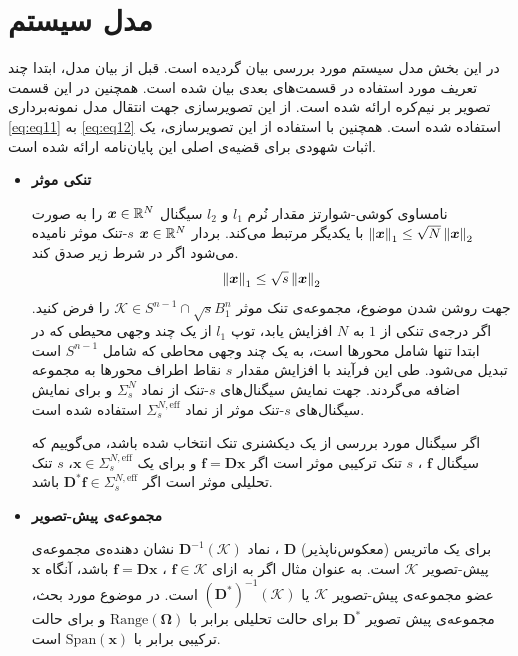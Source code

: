 \section{مدل سیستم}
در این بخش مدل سیستم مورد بررسی بیان گردیده است. قبل از بیان مدل، ابتدا چند تعریف مورد استفاده در قسمت‌های بعدی بیان شده است. همچنین در این قسمت تصویر بر نیم‌کره
ارائه شده است. از این تصویرسازی جهت انتقال مدل نمونه‌برداری 
\eqref{eq:eq11}
به 
\eqref{eq:eq12}
استفاده شده است. همچنین با استفاده از این تصویرسازی، یک اثبات شهودی برای قضیه‌ی اصلی این پایان‌نامه ارائه شده است.
\begin{itemize}
\item{
\textbf{تنکی موثر}


نامساوی کوشی-شوارتز مقدار نُرم
$ l_1 $
و 
$ l_2 $
سیگنال 
$ \bm{x}\in \mathbb{R}^{N} $
را به صورت 
$ \left\lVert\bm{x}\right\rVert_{1}\leq \sqrt{N}\left\lVert\bm{x}\right\rVert_{2} $
با یکدیگر مرتبط می‌کند.
بردار 
$ \bm{x}\in \mathbb{R}^{N} $
$s$-تنک موثر
نامیده می‌شود اگر در شرط زیر صدق کند.
\begin{align}
\label{eq:eq28}
\left\lVert\bm{x}\right\rVert_{1}\leq \sqrt{s}\left\lVert\bm{x}\right\rVert_{2}
\end{align}
جهت روشن شدن موضوع، مجموعه‌ی تنک موثر
$ \mathcal{K} \in S^{n-1}\cap \sqrt{s}B^{n}_{1} $
را فرض کنید. اگر درجه‌ی تنکی از
$1$
به 
$N$
افزایش یابد، توپ 
$l_1$
از یک چند وجهی محیطی که در ابتدا تنها شامل محورها است، به یک چند وجهی محاطی که شامل 
$ S^{n-1} $
است تبدیل می‌شود. طی این فرآیند با افزایش مقدار
$s$
نقاط اطراف محور‌ها به مجموعه اضافه می‌گردند. جهت نمایش سیگنال‌های 
$s$-تنک
از نماد
$ \Sigma^{N}_{s} $
و برای نمایش سیگنال‌های 
$s$-تنک موثر
از نماد 
$ \Sigma^{N,\text{eff}}_{s} $
استفاده شده است.

اگر سیگنال مورد بررسی از یک دیکشنری تنک انتخاب شده باشد، می‌گوییم که سیگنال
$ \bm{f} $
، 
$ s $
تنک ترکیبی موثر است اگر
$ \bm{f}=\bm{D}\bm{x} $
و برای یک 
$ \bm{x}\in \Sigma^{N,\text{eff}}_{s} $،
$ s $
تنک تحلیلی موثر است اگر
$ \bm{D}^{\ast}\bm{f}\in \Sigma^{N,\text{eff}}_{s} $
باشد.
}
\item{\textbf{مجموعه‌ی پیش-تصویر}

برای یک ماتریس (معکوس‌ناپذیر)
$ \bm{D} $
، نماد
$ \bm{D}^{-1}(\mathcal{K}) $
نشان دهنده‌ی مجموعه‌ی پیش-تصویر 
$ \mathcal{K} $
است. به عنوان مثال اگر به ازای
$\bm{f}\in \mathcal{K} $
،
$\bm{f}= \bm{D}\bm{x}$
باشد، آنگاه 
$\bm{x}$
عضو مجموعه‌ی پیش-تصویر 
$\mathcal{K}$
یا
$ (\bm{D}^{\ast})^{-1}(\mathcal{K})$
است.  در موضوع مورد بحث، مجموعه‌ی پیش تصویر
$ \bm{D}^{\ast} $
برای حالت تحلیلی
برابر با
$ \text{Range}(\bm{\Omega}) $
و برای حالت ترکیبی برابر با
$ \text{Span}(\bm{x}) $
است.
}
\end{itemize}

